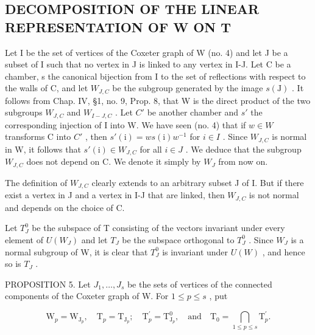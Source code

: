 \subsection{DECOMPOSITION OF THE LINEAR REPRESENTATION OF W ON T}

Let I be the set of vertices of the Coxeter graph of W (no. 4) and let J be a subset of I such that no vertex in J is linked to any vertex in I-J. Let C be a chamber, s the canonical bijection from I to the set of reflections with respect to the walls of C, and let \(W_{J,C}\) be the subgroup generated by the image \(s(\mathrm{J})\) . It follows from Chap. IV, §1, no. 9, Prop. 8, that W is the direct product of the two subgroups \(W_{J,C}\) and \(W_{I-J,C}\) . Let \(C'\) be another chamber and \(s'\) the corresponding injection of I into W. We have seen (no. 4) that if \(w \in W\) transforms C into \(C'\) , then \(s'(\mathrm{i}) = ws(\mathrm{i})w^{-1}\) for \(i \in I\) . Since \(W_{J,C}\) is normal in W, it follows that \(s'(\mathrm{i}) \in W_{J,C}\) for all \(i \in J\) . We deduce that the subgroup \(W_{J,C}\) does not depend on C. We denote it simply by \(W_{J}\) from now on.

The definition of \(W_{J,C}\) clearly extends to an arbitrary subset J of I. But if there exist a vertex in J and a vertex in I-J that are linked, then \(W_{J,C}\) is not normal and depends on the choice of C.

Let \(T_{J}^{0}\) be the subspace of T consisting of the vectors invariant under every element of \(U(W_{J})\) and let \(T_{J}\) be the subspace orthogonal to \(T_{J}^{0}\) . Since \(W_{J}\) is a normal subgroup of W, it is clear that \(T_{J}^{0}\) is invariant under \(U(W)\) , and hence so is \(T_{J}\) .

PROPOSITION 5. Let \(J_{1},\ldots,J_{s}\) be the sets of vertices of the connected components of the Coxeter graph of W. For \(1\leqslant p\leqslant s\) , put

\[
\mathrm{W} _ {p} = \mathrm{W} _ {\mathrm{J} _ {p}}, \quad \mathrm{T} _ {p} = \mathrm{T} _ {\mathrm{J} _ {p}}; \quad \mathrm{T} _ {p} ^ {\prime} = \mathrm{T} _ {\mathrm{J} _ {p}} ^ {0}, \quad \text {and} \quad \mathrm{T} _ {0} = \bigcap_ {1 \leqslant p \leqslant s} \mathrm{T} _ {p} ^ {\prime}.
\]

